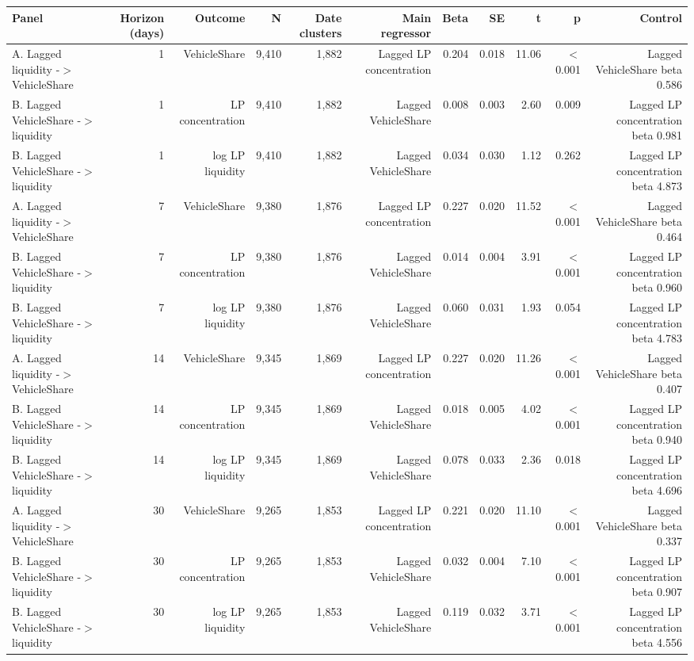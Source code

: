 \begin{tabular}{lrrrrrrrrrr}
\toprule
Panel & Horizon (days) & Outcome & N & Date clusters & Main regressor & Beta & SE & t & p & Control \\
\midrule
A. Lagged liquidity -\ensuremath{>} VehicleShare & 1 & VehicleShare & 9,410 & 1,882 & Lagged LP concentration & 0.204 & 0.018 & 11.06 & \ensuremath{<}0.001 & Lagged VehicleShare beta 0.586 \\
B. Lagged VehicleShare -\ensuremath{>} liquidity & 1 & LP concentration & 9,410 & 1,882 & Lagged VehicleShare & 0.008 & 0.003 & 2.60 & 0.009 & Lagged LP concentration beta 0.981 \\
B. Lagged VehicleShare -\ensuremath{>} liquidity & 1 & log LP liquidity & 9,410 & 1,882 & Lagged VehicleShare & 0.034 & 0.030 & 1.12 & 0.262 & Lagged LP concentration beta 4.873 \\
A. Lagged liquidity -\ensuremath{>} VehicleShare & 7 & VehicleShare & 9,380 & 1,876 & Lagged LP concentration & 0.227 & 0.020 & 11.52 & \ensuremath{<}0.001 & Lagged VehicleShare beta 0.464 \\
B. Lagged VehicleShare -\ensuremath{>} liquidity & 7 & LP concentration & 9,380 & 1,876 & Lagged VehicleShare & 0.014 & 0.004 & 3.91 & \ensuremath{<}0.001 & Lagged LP concentration beta 0.960 \\
B. Lagged VehicleShare -\ensuremath{>} liquidity & 7 & log LP liquidity & 9,380 & 1,876 & Lagged VehicleShare & 0.060 & 0.031 & 1.93 & 0.054 & Lagged LP concentration beta 4.783 \\
A. Lagged liquidity -\ensuremath{>} VehicleShare & 14 & VehicleShare & 9,345 & 1,869 & Lagged LP concentration & 0.227 & 0.020 & 11.26 & \ensuremath{<}0.001 & Lagged VehicleShare beta 0.407 \\
B. Lagged VehicleShare -\ensuremath{>} liquidity & 14 & LP concentration & 9,345 & 1,869 & Lagged VehicleShare & 0.018 & 0.005 & 4.02 & \ensuremath{<}0.001 & Lagged LP concentration beta 0.940 \\
B. Lagged VehicleShare -\ensuremath{>} liquidity & 14 & log LP liquidity & 9,345 & 1,869 & Lagged VehicleShare & 0.078 & 0.033 & 2.36 & 0.018 & Lagged LP concentration beta 4.696 \\
A. Lagged liquidity -\ensuremath{>} VehicleShare & 30 & VehicleShare & 9,265 & 1,853 & Lagged LP concentration & 0.221 & 0.020 & 11.10 & \ensuremath{<}0.001 & Lagged VehicleShare beta 0.337 \\
B. Lagged VehicleShare -\ensuremath{>} liquidity & 30 & LP concentration & 9,265 & 1,853 & Lagged VehicleShare & 0.032 & 0.004 & 7.10 & \ensuremath{<}0.001 & Lagged LP concentration beta 0.907 \\
B. Lagged VehicleShare -\ensuremath{>} liquidity & 30 & log LP liquidity & 9,265 & 1,853 & Lagged VehicleShare & 0.119 & 0.032 & 3.71 & \ensuremath{<}0.001 & Lagged LP concentration beta 4.556 \\
\bottomrule
\end{tabular}
